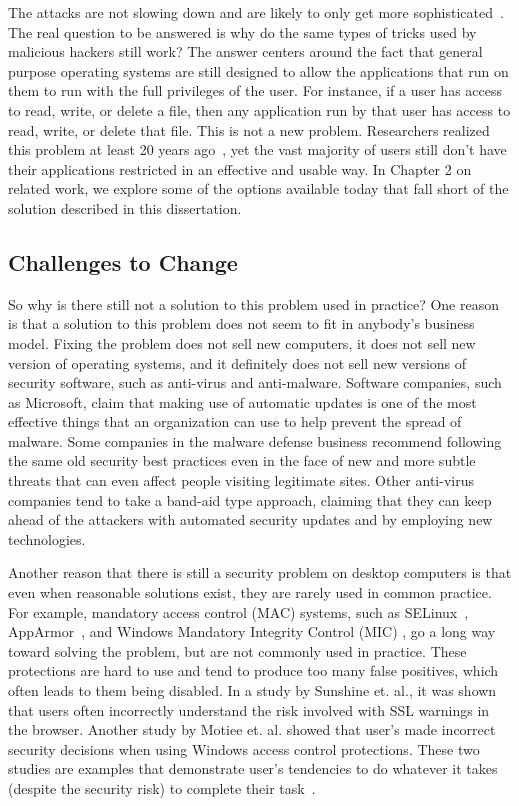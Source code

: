 The attacks are not slowing down and are likely to only get more sophisticated~\cite{wired_2010, damballa_2010,damballa_blog_2010}. The real question to be answered is why do the same types of tricks used by malicious hackers still work? The answer centers around the fact that general purpose operating systems are still designed to allow the applications that run on them to run with the full privileges of the user. For instance, if a user has access to read, write, or delete a file, then any application run by that user has access to read, write, or delete that file. This is not a new problem. Researchers realized this problem at least 20 years ago~\cite{Lai_88}, yet the vast majority of users still don't have their applications restricted in an effective and usable way. In Chapter 2 on related work, we explore some of the options available today that fall short of the solution described in this dissertation. 

\subsection{Challenges to Change}

So why is there still not a solution to this problem used in practice? One reason is that a solution to this problem does not seem to fit in anybody's business model. Fixing the problem does not sell new computers, it does not sell new version of operating systems, and it definitely does not sell new versions of security software, such as anti-virus and anti-malware. Software companies, such as Microsoft, claim that making use of automatic updates is one of the most effective things that an organization can use to help prevent the spread of malware\cite{MS_SIR_2009}. Some companies in the malware defense business recommend following the same old security best practices \cite{cto_roundtable_malware_defense_2010} even in the face of new and more subtle threats that can even affect people visiting legitimate sites\cite{NewYork_Times_2009}. Other anti-virus companies tend to take a band-aid type approach, claiming that they can keep ahead of the attackers with automated security updates and by employing new technologies\cite{Enterprise_IT_Planet_2009}.

Another reason that there is still a security problem on desktop computers is that even when reasonable solutions exist, they are rarely used in common practice. For example, mandatory access control (MAC) systems, such as SELinux~\cite{loscocco_2001}, AppArmor~\cite{AppArmor_2006}, and Windows Mandatory Integrity Control (MIC) \cite{mandatory_integrity_control}, go a long way toward solving the problem, but are not commonly used in practice. These protections are hard to use and tend to produce too many false positives, which often leads to them being disabled. In a study by Sunshine et. al., it was shown that users often incorrectly understand the risk involved with SSL warnings in the browser. Another study by Motiee et. al. showed that user's made incorrect security decisions when using Windows access control protections\cite{motiee_chi_2010}. These two studies are examples that demonstrate user's tendencies to do whatever it takes (despite the security risk) to complete their task~\cite{sunshine_wolf_2009}.

